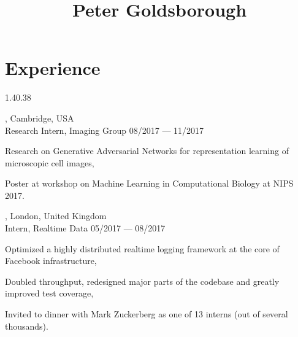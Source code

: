 




\begin{header}
	\title{Peter Goldsborough}
	\separate
	\separate
\end{header}

\section{Experience}{1.4}{0.38}

\begin{entry}
	{, Cambridge, USA}
	{\\Research Intern, Imaging Group}
	{08/2017 --- 11/2017}
	\item Research on Generative Adversarial Networks for representation learning of microscopic cell images,
  \item Poster at workshop on Machine Learning in Computational Biology at NIPS 2017.
\end{entry}

\begin{entry}
	{, London, United Kingdom}
	{\\Intern, Realtime Data}
	{05/2017 --- 08/2017}
	\item Optimized a highly distributed realtime logging framework at the core of Facebook infrastructure,
  \item Doubled throughput, redesigned major parts of the codebase and greatly improved test coverage,
  \item Invited to dinner with Mark Zuckerberg as one of 13 interns (out of several thousands).
\end{entry}


